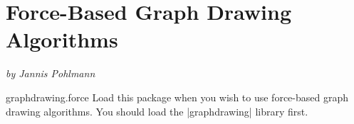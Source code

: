 %
%
%

\section{Force-Based Graph Drawing Algorithms}
\label{section-library-graphdrawing-force-based}

{\emph{by Jannis Pohlmann}}


\begin{tikzlibrary}{graphdrawing.force}
  Load this package when you wish to use force-based graph drawing
  algorithms. You should load the |graphdrawing| library first.
\end{tikzlibrary}

\ifluatex\relax{}\expandafter\endinput\fi


\subsection{Overview}


...

\subsubsection{Spring and Spring-Electrical Layouts}


